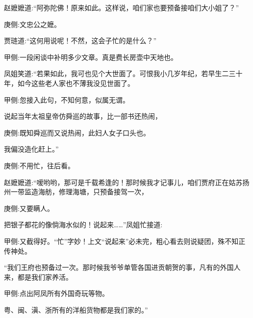\begin{parag}
    赵嬷嬷道:“阿弥陀佛！原来如此。这样说，咱们家也要预备接咱们大小姐了？”\begin{note}庚侧:文忠公之嬷。\end{note}贾琏道:“这何用说呢！不然，这会子忙的是什么？”\begin{note}甲侧:一段闲谈中补明多少文章。真是费长房壶中天地也。\end{note}凤姐笑道:“若果如此，我可也见个大世面了。可恨我小几岁年纪，若早生二三十年，如今这些老人家也不薄我没见世面了。\begin{note}甲侧:忽接入此句，不知何意，似属无谓。\end{note}说起当年太祖皇帝仿舜巡的故事，比一部书还热闹，\begin{note}庚侧:既知舜巡而又说热闹，此妇人女子口头也。\end{note}我偏没造化赶上。”\begin{note}庚侧:不用忙，往后看。\end{note}赵嬷嬷道:“嗳哟哟，那可是千载希逢的！那时候我才记事儿，咱们贾府正在姑苏扬州一带监造海舫，修理海塘，只预备接驾一次，\begin{note}庚侧:又要瞒人。\end{note}把银子都花的像倘海水似的！说起来……”凤姐忙接道:\begin{note}甲侧:又截得好。“忙”字妙！上文“说起来”必未完，粗心看去则说疑团，殊不知正传神处。\end{note}“我们王府也预备过一次。那时候我爷爷单管各国进贡朝贺的事，凡有的外国人来，都是我们家养活。\begin{note}甲侧:点出阿凤所有外国奇玩等物。\end{note}粤、闽、滇、浙所有的洋船货物都是我们家的。”
\end{parag}


